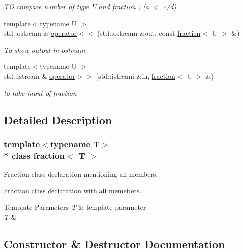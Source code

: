 \begin{DoxyCompactItemize}
\begin{DoxyCompactList}\small\item\em TO compare number of type U and fraction ; (a $<$ c/d) \end{DoxyCompactList}\item 
{\footnotesize template$<$typename U $>$ }\\std\+::ostream \& \hyperlink{classfraction_adf5c6cc9e7c3bb976f2c49014c142fa3}{operator$<$$<$} (std\+::ostream \&out, const \hyperlink{classfraction}{fraction}$<$ U $>$ \&)
\begin{DoxyCompactList}\small\item\em To show output in ostream. \end{DoxyCompactList}\item 
{\footnotesize template$<$typename U $>$ }\\std\+::istream \& \hyperlink{classfraction_a09765f79b9f5af95135d537284a84b7a}{operator$>$$>$} (std\+::istream \&in, \hyperlink{classfraction}{fraction}$<$ U $>$ \&)
\begin{DoxyCompactList}\small\item\em to take input of fraction \end{DoxyCompactList}\end{DoxyCompactItemize}


\subsection{Detailed Description}
\subsubsection*{template$<$typename T$>$\\*
class fraction$<$ T $>$}

Fraction class declaration mentioning all members. 

Fraction class declaration with all memebers.


\begin{DoxyTemplParams}{Template Parameters}
{\em T} & template parameter\\
\hline
{\em T} & \\
\hline
\end{DoxyTemplParams}


\subsection{Constructor \& Destructor Documentation}

